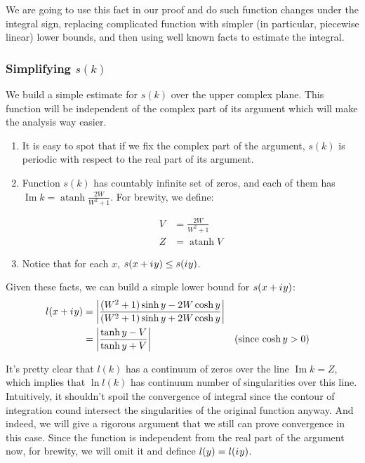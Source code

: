 \documentclass{gCOV2e}
\theoremstyle{plain}%
\theoremstyle{definition}
\theoremstyle{remark}
\newcommand{\iu}{{i\mkern1mu}} %
\newcommand\abs[1]{\left|#1\right|}
\DeclareMathOperator\atanh{atanh}
\begin{document}
We are going to use this fact in our proof and do such function changes under the integral sign, replacing complicated function with simpler (in particular, piecewise linear) lower bounds, and then using well known facts to estimate the integral.

\subsubsection{Simplifying $s(k)$}
We build a simple estimate for $s(k)$ over the upper complex plane. This function will be independent of the complex part of its argument which will make the analysis way easier.

\begin{enumerate}
\item
  It is easy to spot that if we fix the complex part of the argument, $s(k)$ is periodic with respect to the real part of its argument.
\item 
  Function $s(k)$ has countably infinite set of zeros, and each of them has $\operatorname{Im} k = \atanh \frac{2 W}{W^2 + 1}$. For brewity, we define:

  \begin{equation*}
  \begin{aligned}
     V &= \frac{2 W}{W^2 + 1}
  \\ Z &= \atanh V
  \end{aligned}
  \end{equation*}
\item
  Notice that for each $x$, $s(x + \iu y) \le s(\iu y)$.
\end{enumerate}

Given these facts, we can build a simple lower bound for $s(x + \iu y)$:
\begin{align*}
l(x + \iu y)
   &= \abs{\frac{(W^2 + 1) \sinh y - 2 W \cosh y}{(W^2 + 1) \sinh y + 2 W \cosh y}}
\\ &= \abs{\frac{\tanh y - V}{\tanh y + V}} && \text{(since $\cosh y > 0$)}
\end{align*}

It's pretty clear that $l(k)$ has a continuum of zeros over the line $\operatorname{Im} k = Z$, which implies that $\ln l(k)$ has continuum number of singularities over this line. Intuitively, it shouldn't spoil the convergence of integral since the contour of integration cound intersect the singularities of the original function anyway. And indeed, we will give a rigorous argument that we still can prove convergence in this case. Since the function is independent from the real part of the argument now, for brewity, we will omit it and defince $l(y) = l(\iu y)$.
\end{document}
